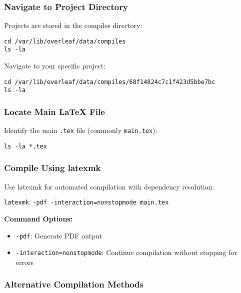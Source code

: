 \subsubsection{Navigate to Project Directory}

Projects are stored in the compiles directory:

\begin{verbatim}
cd /var/lib/overleaf/data/compiles
ls -la
\end{verbatim}

Navigate to your specific project:

\begin{verbatim}
cd /var/lib/overleaf/data/compiles/68f14824c7c1f423d5bbe7bc
ls -la
\end{verbatim}

\subsubsection{Locate Main LaTeX File}

Identify the main \texttt{.tex} file (commonly \texttt{main.tex}):

\begin{verbatim}
ls -la *.tex
\end{verbatim}

\subsubsection{Compile Using latexmk}

Use latexmk for automated compilation with dependency resolution:

\begin{verbatim}
latexmk -pdf -interaction=nonstopmode main.tex
\end{verbatim}

\textbf{Command Options:}
\begin{itemize}
    \item \texttt{-pdf}: Generate PDF output
    \item \texttt{-interaction=nonstopmode}: Continue compilation without stopping for errors
\end{itemize}

\subsubsection{Alternative Compilation Methods}

